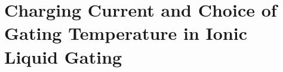 \chapter{Charging Current and Choice of Gating Temperature in Ionic Liquid Gating\label{ch:Gating_T}}

%
%
%
%
%
%
%
